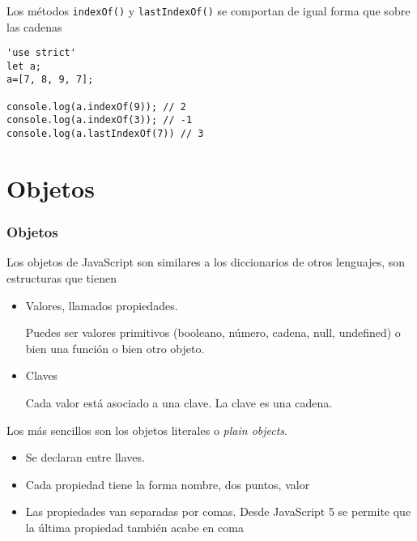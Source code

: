 \documentclass[ucs]{beamer}
\begin{document}
\begin{frame}[fragile]
\frametitle{}
Los métodos
\verb|indexOf()|
y
\verb|lastIndexOf()|
se comportan de igual forma que sobre las cadenas


  \begin{scriptsize}
  \begin{verbatim}
'use strict'
let a;
a=[7, 8, 9, 7];

console.log(a.indexOf(9)); // 2
console.log(a.indexOf(3)); // -1
console.log(a.lastIndexOf(7)) // 3
  \end{verbatim}
  \end{scriptsize}


\end{frame}


\section{Objetos}
\begin{frame}[fragile]
\frametitle{Objetos}
Los objetos de JavaScript son similares a los diccionarios de otros lenguajes,
son estructuras que tienen 


    \begin{itemize}
    \item
Valores, llamados propiedades. 

Puedes ser valores primitivos (booleano, número, cadena, null, undefined) o bien una función o bien otro objeto.

    \item
Claves

Cada valor está asociado a una clave. La clave es una cadena.
    \end{itemize}


Los más sencillos son los objetos literales
o \emph{plain objects}.

\begin{itemize}
\item
Se declaran entre llaves.
\item
Cada propiedad tiene la forma
nombre, dos puntos, valor
\item
Las propiedades van separadas por comas. Desde JavaScript 5 se permite
que la última propiedad también acabe en coma

\end{itemize}

\end{frame}
\end{document}
